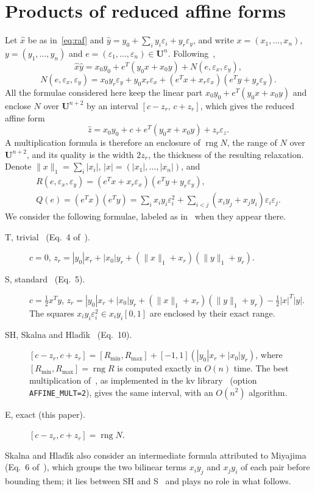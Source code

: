 \documentclass[10pt]{article}
\theoremstyle{definition}
\newcommand{\U}{\mathbf{U}}
\newcommand{\eps}{\varepsilon}
\newcommand{\ex}{\eps_x}
\newcommand{\ey}{\eps_y}
\newcommand{\rng}{\operatorname{rng}}
\begin{document}
\section{Products of reduced affine forms}
\label{sec:products}

Let $\hat x$ be as in~\eqref{eq:raf} and $\hat y = y_0+\sum_i y_i\eps_i + y_r\ey$, and write $x=(x_1,\dots,x_n)$, $y=(y_1,\dots,y_n)$ and $e=(\eps_1,\dots,\eps_n)\in\U^n$. Following~\cite{skalna2017new},
\begin{equation}
\label{eq:product}
\hat x\hat y = x_0y_0 + e^T(y_0x+x_0y) + N(e,\ex,\ey),
\end{equation}
\begin{equation}
\label{eq:N}
N(e,\ex,\ey) = x_0y_r\ey + y_0x_r\ex + (e^Tx + x_r\ex)(e^Ty + y_r\ey).
\end{equation}
All the formulae considered here keep the linear part $x_0y_0+e^T(y_0x+x_0y)$ and enclose $N$ over $\U^{n+2}$ by an interval $[c-z_r,\,c+z_r]$, which gives the reduced affine form
\begin{equation}
\label{eq:zhat}
\hat z = x_0y_0 + c + e^T(y_0x+x_0y) + z_r\eps_z .
\end{equation}
A multiplication formula is therefore an enclosure of $\rng N$, the range of $N$ over $\U^{n+2}$, and its quality is the width $2z_r$, the thickness of the resulting relaxation. Denote $\|x\|_1=\sum_i|x_i|$, $|x|=(|x_1|,\dots,|x_n|)$, and
\[
\begin{gathered}R(e,\ex,\ey) = (e^Tx + x_r\ex)(e^Ty + y_r\ey),\\ Q(e) = (e^Tx)(e^Ty) = \sum_i x_iy_i\eps_i^2 + \sum_{i<j}(x_iy_j+x_jy_i)\eps_i\eps_j .\end{gathered}
\]
We consider the following formulae, labeled as in~\cite{skalna2017new} when they appear there.
\begin{description}
\item[T, trivial~\cite{stolfi1997self} (Eq.~4 of~\cite{skalna2017new}).] $c=0$, $z_r = |y_0|x_r+|x_0|y_r+(\|x\|_1+x_r)(\|y\|_1+y_r)$.
\item[S, standard~\cite{kolev2004improved,vu2009enhancing} (Eq.~5).] $c=\tfrac12 x^Ty$, $z_r = |y_0|x_r+|x_0|y_r+(\|x\|_1+x_r)(\|y\|_1+y_r) - \tfrac12|x|^T|y|$. The squares $x_iy_i\eps_i^2\in x_iy_i[0,1]$ are enclosed by their exact range.
\item[SH, Skalna and Hlad\'{\i}k~\cite{skalna2017new} (Eq.~10).] $[c-z_r,c+z_r] = [R_{\min},R_{\max}] + [-1,1](|y_0|x_r+|x_0|y_r)$, where $[R_{\min},R_{\max}]=\rng R$ is computed exactly in $O(n)$ time. The best multiplication of~\cite{miyajima2003best}, as implemented in the kv library~\cite{kvlib} (option \texttt{AFFINE\_MULT=2}), gives the same interval, with an $O(n^2)$ algorithm.
\item[E, exact (this paper).] $[c-z_r,c+z_r]=\rng N$.
\end{description}
Skalna and Hlad\'{\i}k also consider an intermediate formula attributed to Miyajima (Eq.~6 of~\cite{skalna2017new}), which groups the two bilinear terms $x_iy_j$ and $x_jy_i$ of each pair before bounding them; it lies between SH and S~\cite[Prop.~3]{skalna2017new} and plays no role in what follows.
\end{document}
